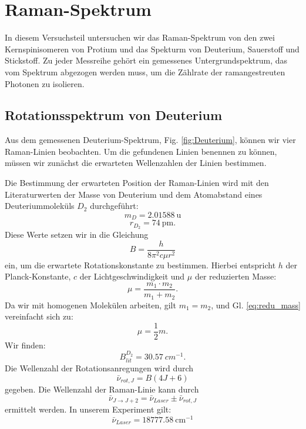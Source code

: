 \documentclass[11pt]{article}
\begin{document}
\section{Raman-Spektrum}
In diesem Versuchsteil untersuchen wir das Raman-Spektrum von den zwei Kernspinisomeren von Protium und das Spekturm von Deuterium, Sauerstoff und Stickstoff. Zu jeder Messreihe gehört ein gemessenes Untergrundspektrum, das vom Spektrum abgezogen werden muss, um die Zählrate der ramangestreuten Photonen zu isolieren.

\subsection{Rotationsspektrum von Deuterium}
Aus dem gemessenen Deuterium-Spektrum, Fig. \ref{fig:Deuterium}, können wir vier Raman-Linien beobachten. Um die gefundenen Linien benennen zu können, müssen wir zunächst die erwarteten Wellenzahlen der Linien bestimmen.

Die Bestimmung der erwarteten Position der Raman-Linien wird mit den Literaturwerten der Masse von Deuterium und dem Atomabstand eines Deuteriummoleküls $D_2$ durchgeführt:
$$m_{D} =\SI{2.01588}{\atomicmassunit}$$
$$r_{D_2} = \SI{74}{\pm}.$$
Diese Werte setzen wir in die Gleichung
\begin{equation}
\label{eq:Rot_const}
B = \frac{h}{8\pi^2 c \mu r^2}
\end{equation}
ein, um die erwartete Rotationskonstante zu bestimmen. Hierbei entspricht $h$ der Planck-Konstante, $c$ der Lichtgeschwindigkeit und $\mu$ der reduzierten Masse:
\begin{equation}
\label{eq:redu_mass}
\mu = \dfrac{m_1 \cdot m_2}{m_1 + m_2}.
\end{equation}
Da wir mit homogenen Molekülen arbeiten, gilt $m_1 = m_2$, und Gl. \ref{eq:redu_mass} vereinfacht sich zu:
\begin{equation}
\mu = \dfrac{1}{2} m.
\end{equation}
Wir finden: 
$$B_{lit}^{D_2} = \SI{30.57}{cm^{-1}}.$$
Die Wellenzahl der Rotationsanregungen wird durch
\begin{equation}
\label{eq:nu_rot,j} 
\bar{\nu}_{rot,J} = B(4J+6)
\end{equation}
gegeben. Die Wellenzahl der Raman-Linie kann durch
\begin{equation}
\bar{\nu}_{J\to J+2} = \bar{\nu}_{Laser} \pm \bar{\nu}_{rot,J}
\end{equation}
ermittelt werden. In unserem Experiment gilt:
$$\bar{\nu}_{Laser} = \SI{18777.58}{\centi\meter^{-1}}$$
\end{document}
